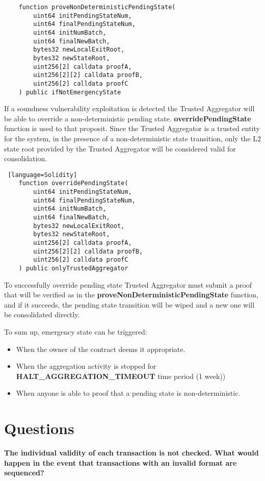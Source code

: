 \begin{lstlisting}
	function proveNonDeterministicPendingState(
		uint64 initPendingStateNum,
		uint64 finalPendingStateNum,
		uint64 initNumBatch,
		uint64 finalNewBatch,
		bytes32 newLocalExitRoot,
		bytes32 newStateRoot,
		uint256[2] calldata proofA,
		uint256[2][2] calldata proofB,
		uint256[2] calldata proofC
	) public ifNotEmergencyState
\end{lstlisting}



 If a soundness vulnerability exploitation is detected the Trusted Aggregator will be able to override a non-deterministic pending state. \textbf{overridePendingState} function is used to that proposit. Since the Trusted Aggregator is a trusted entity for the system, in the presence of a non-deterministic state transition, only the L2 state root provided by the Trusted Aggregator will be considered valid for consolidation.
  
 \begin{lstlisting} [language=Solidity]
 	function overridePendingState(
 		uint64 initPendingStateNum,
 		uint64 finalPendingStateNum,
 		uint64 initNumBatch,
 		uint64 finalNewBatch,
 		bytes32 newLocalExitRoot,
 		bytes32 newStateRoot,
 		uint256[2] calldata proofA,
 		uint256[2][2] calldata proofB,
 		uint256[2] calldata proofC
 	) public onlyTrustedAggregator
 \end{lstlisting}
 
  To successfully override pending state Trusted Aggregator must submit a proof that will be verified as in the \textbf{proveNonDeterministicPendingState} function, and if it succeeds, the pending state transition will be wiped and a new one will be consolidated directly.
 
 To sum up, emergency state can be triggered:
 \begin{itemize}
 	\item When the owner of the contract deems it appropriate.
 	\item When the aggregation activity is stopped for \textbf{HALT\_AGGREGATION\_TIMEOUT} time period (1 week))
 	\item When anyone is able to proof that a pending state is non-deterministic. 
 \end{itemize} 


\ifNOPOLYGON
\section{Questions}
\textbf{The individual validity of each transaction is not checked. What would happen in the event that transactions with an invalid format are sequenced?}

